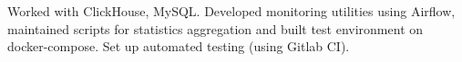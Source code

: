 Worked with ClickHouse, MySQL. 
Developed monitoring utilities using Airflow, maintained scripts for statistics aggregation and built test environment on docker-compose.
Set up automated testing (using Gitlab CI).
